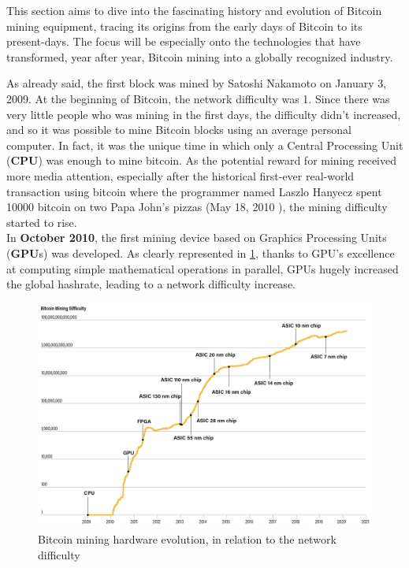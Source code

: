 This section aims to dive into the fascinating history and evolution of Bitcoin mining equipment, tracing its origins from the early days of Bitcoin to its present-days. The focus will be especially onto the technologies that have transformed, year after year, Bitcoin mining into a globally recognized industry.

\noindent As already said, the first block was mined by Satoshi Nakamoto on January 3, 2009. At the beginning of Bitcoin, the network difficulty was 1. Since there was very little people who was mining in the first days, the difficulty didn't increased, and so it was possible to mine Bitcoin blocks using an average personal computer. In fact, it was the unique time in which only a Central Processing Unit (\textbf{CPU}) was enough to mine bitcoin. As the potential reward for mining received more media attention, especially after the historical first-ever real-world transaction using bitcoin where the programmer named Laszlo Hanyecz spent 10000 bitcoin on two Papa John's pizzas (May 18, 2010 \cite{bitcoinpizzas}), the mining difficulty started to rise.\\
In \textbf{October 2010}, the first mining device based on Graphics Processing Units (\textbf{GPU}s) was developed. As clearly represented in \ref{fig:bitcoin_mining_history}, thanks to GPU's excellence at computing simple mathematical operations in parallel, GPUs hugely increased the global hashrate, leading to a network difficulty increase.
\begin{figure}[h!]
\centering
\includegraphics[width=14.5cm]{Figures/mining/mining-evolution.png}
\caption{Bitcoin mining hardware evolution, in relation to the network difficulty}
\label{fig:bitcoin_mining_history}
\end{figure}
